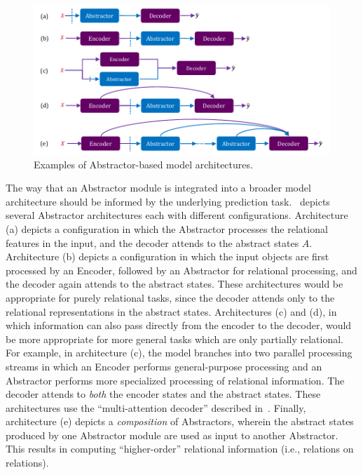 \begin{figure}
    \centering
    \includegraphics[width=.8\textwidth]{figures/abstractor_architectures.pdf}
    \caption{Examples of Abstractor-based model architectures.}\label{fig:abstractor_architectures}
    \vskip-10pt
\end{figure}


The way that an Abstractor module is integrated into a broader model architecture should be informed by the underlying prediction task.~ depicts several Abstractor architectures each with different configurations. Architecture (a) depicts a configuration in which the Abstractor processes the relational features in the input, and the decoder attends to the abstract states $A$. Architecture (b) depicts a configuration in which the input objects are first processed by an Encoder, followed by an Abstractor for relational processing, and the decoder again attends to the abstract states. These architectures would be appropriate for purely relational tasks, since the decoder attends only to the relational representations in the abstract states. Architectures (c) and (d), in which information can also pass directly from the encoder to the decoder, would be more appropriate for more general tasks which are only partially relational. For example, in architecture (c), the model branches into two parallel processing streams in which an Encoder performs general-purpose processing and an Abstractor performs more specialized processing of relational information.
The decoder attends to \textit{both} the encoder states and the abstract states.
These architectures use the ``multi-attention decoder'' described in~.
Finally, architecture (e) depicts a \textit{composition} of Abstractors, wherein the abstract states produced by one Abstractor module are used as input to another Abstractor. This results in computing ``higher-order'' relational information (i.e., relations on relations).
